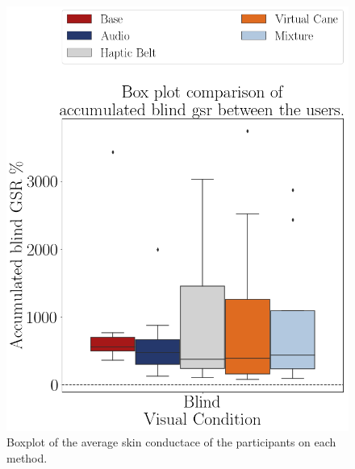 \begin{figure}[!htb]
    \begin{minipage}{.45\linewidth}
        \centering
        \includegraphics[width = \linewidth]{Resultados/GSR/Figuras/png/boxplot_gsr_sum_blind_scene.png}
        \caption{Boxplot of the average skin conductace of the participants on each method.}
        \label{fig:boxplot_gsr_scene}
    \end{minipage}
    \begin{minipage}{.1\linewidth}
        \hfill
    \end{minipage}
    \begin{minipage}{.45\linewidth}
        \vspace{1.8cm}
        \centering

\end{minipage}
\end{figure}
